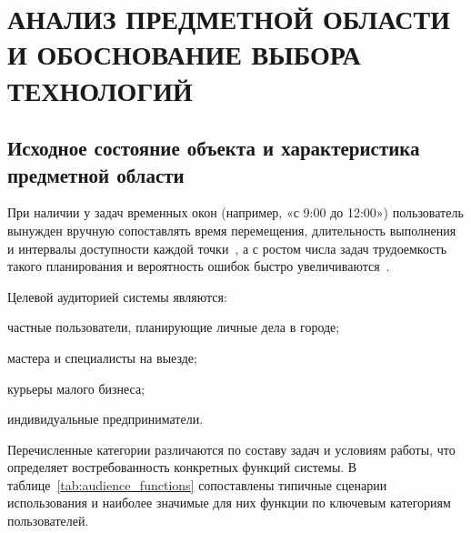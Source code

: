 \chapter{{\fontsize{14pt}{21pt}\selectfont\MakeUppercase{Анализ предметной области и обоснование выбора технологий}}}
\label{cha:analysis}

\section{Исходное состояние объекта и характеристика предметной области}

При наличии у задач временных окон (например, «с 9:00 до 12:00»)
пользователь вынужден вручную сопоставлять время перемещения, длительность
выполнения и интервалы доступности каждой точки~\cite{alessandretti2022urban,posledynyaya_milya},
а с ростом числа задач трудоемкость такого планирования и вероятность ошибок
быстро увеличиваются~\cite{reshenie_zadach_planirovaniya2020}.

Целевой аудиторией системы являются:

\begin{compactlist}
  \item частные пользователи, планирующие личные дела в городе;
  \item мастера и специалисты на выезде;
  \item курьеры малого бизнеса;
  \item индивидуальные предприниматели.
\end{compactlist}

Перечисленные категории различаются по составу задач и условиям работы, что
определяет востребованность конкретных функций системы. В
таблице~\ref{tab:audience_functions} сопоставлены типичные сценарии
использования и наиболее значимые для них функции по ключевым категориям
пользователей.

